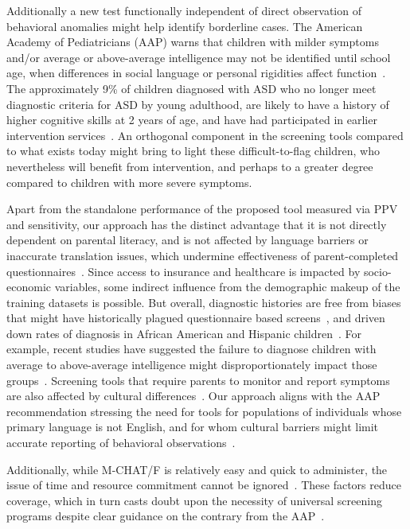 \documentclass[onecolumn,,10pt]{IEEEtran}
\begin{document}
Additionally a new test  functionally independent of direct observation of behavioral anomalies  might help identify  borderline cases.  The American Academy of Pediatricians (AAP) warns that children with milder symptoms and/or average or above-average
intelligence  may not be identified
 until school age,
when differences in social language
or personal rigidities affect function~\cite{hyman2020identification}.
The approximately 9\% of children  diagnosed with ASD who no longer meet diagnostic
criteria for ASD by young adulthood, are likely to have a history
of higher cognitive skills at 2 years of
age, and have had  participated in earlier
intervention services~\cite{anderson2014predicting}. An orthogonal component in the screening tools compared  to what exists today might bring to light  these difficult-to-flag children, who nevertheless will benefit from intervention, and perhaps  to a greater degree~\cite{hyman2020identification,anderson2014predicting} compared to children with more severe symptoms.
%

Apart from the  standalone performance of the proposed tool measured via PPV and sensitivity, our  approach has the distinct advantage that it  is not directly dependent on  parental literacy, and is not affected by  language barriers or inaccurate translation issues, which undermine  effectiveness of parent-completed questionnaires~\cite{scarpa2013modified}. Since access to insurance and healthcare  is impacted   by socio-economic  variables,  some indirect influence from the demographic makeup of the training datasets is possible. But overall, diagnostic histories are free from   biases that might have historically plagued questionnaire based screens~\cite{hyman2020identification}, and driven down rates of diagnosis in African American and Hispanic children~\cite{pmid29701730}. For example, recent studies have suggested the failure to diagnose children with  average to above-average intelligence might disproportionately impact those groups~\cite{christensen2019prevalence}.  Screening tools  that
require parents to monitor and report  symptoms are also affected by cultural differences~\cite{burkett2015african}. Our approach aligns with the AAP recommendation stressing the need for  tools  for
populations of individuals whose
primary language is not English, and
for whom cultural
barriers might limit accurate reporting of
behavioral observations~\cite{zuckerman2017disparities}.

Additionally, while M-CHAT/F is relatively easy and quick to administer, the issue of time and resource commitment cannot be ignored~\cite{hyman2020identification}. These factors  reduce coverage, which in turn  casts  doubt upon the necessity of universal screening programs despite clear guidance on the contrary from the AAP~\cite{pmid31562252}.
\end{document}
